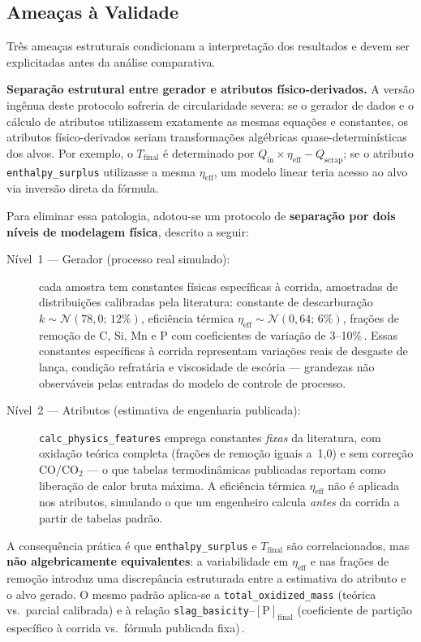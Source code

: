\subsection{Ameaças à Validade}
\label{subsec:ameacas-validade}

Três ameaças estruturais condicionam a interpretação dos resultados e devem ser explicitadas antes da análise comparativa.

\textbf{Separação estrutural entre gerador e atributos físico-derivados.}
A versão ingênua deste protocolo sofreria de circularidade severa: se o gerador de dados e o cálculo de atributos utilizassem exatamente as mesmas equações e constantes, os atributos físico-derivados seriam transformações algébricas quase-determinísticas dos alvos.
Por exemplo, o $T_\text{final}$ é determinado por $Q_\text{in} \times \eta_\text{eff} - Q_\text{scrap}$; se o atributo \texttt{enthalpy\_surplus} utilizasse a mesma $\eta_\text{eff}$, um modelo linear teria acesso ao alvo via inversão direta da fórmula.

Para eliminar essa patologia, adotou-se um protocolo de \textbf{separação por dois níveis de modelagem física}, descrito a seguir:

\begin{description}
  \item[Nível~1 — Gerador (processo real simulado):] cada amostra tem constantes físicas específicas à corrida, amostradas de distribuições calibradas pela literatura: constante de descarburação $k \sim \mathcal{N}(78{,}0;\, 12\%)$, eficiência térmica $\eta_\text{eff} \sim \mathcal{N}(0{,}64;\, 6\%)$, frações de remoção de C, Si, Mn e P com coeficientes de variação de 3–10\%\,\cite{chattopadhyay2022hybrid,logar2022eaf}. Essas constantes específicas à corrida representam variações reais de desgaste de lança, condição refratária e viscosidade de escória --- grandezas não observáveis pelas entradas do modelo de controle de processo.
  \item[Nível~2 — Atributos (estimativa de engenharia publicada):] \texttt{calc\_physics\_features} emprega constantes \emph{fixas} da literatura, com oxidação teórica completa (frações de remoção iguais a~1,0) e sem correção CO/CO$_2$ --- o que tabelas termodinâmicas publicadas reportam como liberação de calor bruta máxima. A eficiência térmica $\eta_\text{eff}$ não é aplicada nos atributos, simulando o que um engenheiro calcula \emph{antes} da corrida a partir de tabelas padrão.
\end{description}

A consequência prática é que \texttt{enthalpy\_surplus} e $T_\text{final}$ são correlacionados, mas \textbf{não algebricamente equivalentes}: a variabilidade em $\eta_\text{eff}$ e nas frações de remoção introduz uma discrepância estruturada entre a estimativa do atributo e o alvo gerado. O mesmo padrão aplica-se a \texttt{total\_oxidized\_mass} (teórica vs.\ parcial calibrada) e à relação \texttt{slag\_basicity}–$[\text{P}]_\text{final}$ (coeficiente de partição específico à corrida vs.\ fórmula publicada fixa)\,\cite{bae2020bof}.

